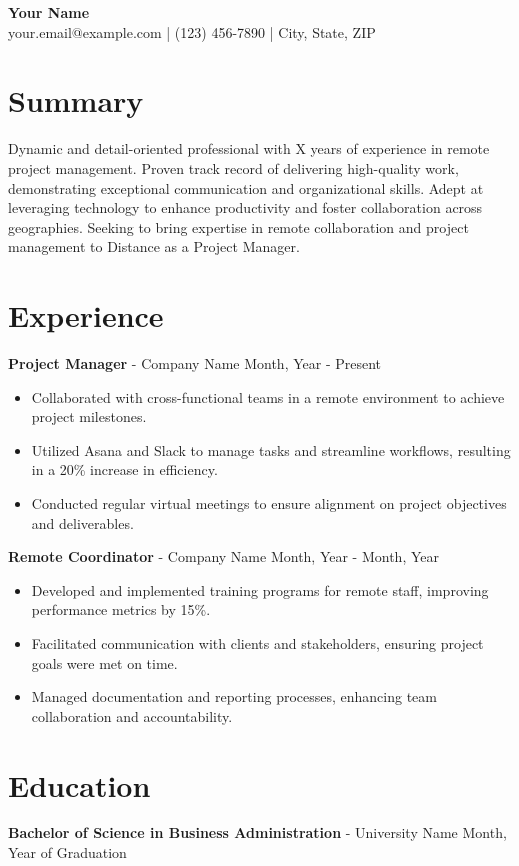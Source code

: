 \documentclass[11pt]{article}
\begin{document}
\begin{center}
\textbf{\huge Your Name} \\
your.email@example.com | (123) 456-7890 | City, State, ZIP
\end{center}

\section*{Summary}
Dynamic and detail-oriented professional with X years of experience in remote project management. Proven track record of delivering high-quality work, demonstrating exceptional communication and organizational skills. Adept at leveraging technology to enhance productivity and foster collaboration across geographies. Seeking to bring expertise in remote collaboration and project management to Distance as a Project Manager.

\section*{Experience}
\textbf{Project Manager} - Company Name \hfill Month, Year - Present
\begin{itemize}[noitemsep]
    \item Collaborated with cross-functional teams in a remote environment to achieve project milestones.
    \item Utilized Asana and Slack to manage tasks and streamline workflows, resulting in a 20\% increase in efficiency.
    \item Conducted regular virtual meetings to ensure alignment on project objectives and deliverables.
\end{itemize}

\textbf{Remote Coordinator} - Company Name \hfill Month, Year - Month, Year
\begin{itemize}[noitemsep]
    \item Developed and implemented training programs for remote staff, improving performance metrics by 15\%.
    \item Facilitated communication with clients and stakeholders, ensuring project goals were met on time.
    \item Managed documentation and reporting processes, enhancing team collaboration and accountability.
\end{itemize}

\section*{Education}
\textbf{Bachelor of Science in Business Administration} - University Name \hfill Month, Year of Graduation
\end{document}
